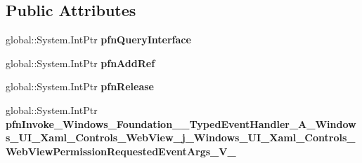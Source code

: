 \subsection*{Public Attributes}
\begin{DoxyCompactItemize}
\item 
\mbox{\label{struct_windows_1_1_foundation_1_1_typed_event_handler___a___windows___u_i___xaml___controls___we02730dfc82c56beef290621040cade95_af77a6d3e9e8176086e7ceb7c1765ec8c}} 
global\+::\+System.\+Int\+Ptr {\bfseries pfn\+Query\+Interface}
\item 
\mbox{\label{struct_windows_1_1_foundation_1_1_typed_event_handler___a___windows___u_i___xaml___controls___we02730dfc82c56beef290621040cade95_ac2252d7aff75f20c8df3b2741ad0633c}} 
global\+::\+System.\+Int\+Ptr {\bfseries pfn\+Add\+Ref}
\item 
\mbox{\label{struct_windows_1_1_foundation_1_1_typed_event_handler___a___windows___u_i___xaml___controls___we02730dfc82c56beef290621040cade95_a9117ba3f878a862129b200673c89a650}} 
global\+::\+System.\+Int\+Ptr {\bfseries pfn\+Release}
\item 
\mbox{\label{struct_windows_1_1_foundation_1_1_typed_event_handler___a___windows___u_i___xaml___controls___we02730dfc82c56beef290621040cade95_a3e39390592ad9d033e7d95fd85dfa371}} 
global\+::\+System.\+Int\+Ptr {\bfseries pfn\+Invoke\+\_\+\+Windows\+\_\+\+Foundation\+\_\+\+\_\+\+Typed\+Event\+Handler\+\_\+\+A\+\_\+\+Windows\+\_\+\+U\+I\+\_\+\+Xaml\+\_\+\+Controls\+\_\+\+Web\+View\+\_\+j\+\_\+\+Windows\+\_\+\+U\+I\+\_\+\+Xaml\+\_\+\+Controls\+\_\+\+Web\+View\+Permission\+Requested\+Event\+Args\+\_\+\+V\+\_\+}
\end{DoxyCompactItemize}
